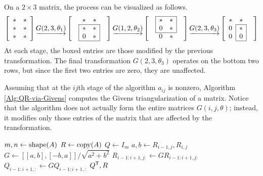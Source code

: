 On a $2 \times 3$ matrix, the process can be visualized as follows.
\[
\left[\begin{array}{cc}
* & * \\
* & * \\
* & * \\
\end{array}\right]
\underrightarrow{G(2,3,\theta_1)}
\left[\begin{array}{cccc}
&      *  &      *  & \\
\cline{2-3}
& \lvl{*} & \rvl{*} & \\
& \lvl{0} & \rvl{*} & \\
\cline{2-3}
\end{array}\right]
\underrightarrow{G(1,2,\theta_2)}
\left[\begin{array}{cccc}
\cline{2-3}
& \lvl{*} & \rvl{*} & \\
& \lvl{0} & \rvl{*} & \\
\cline{2-3}
&      0  &      *  & \\
\end{array}\right]
\underrightarrow{G(2,3,\theta_3)}
\left[\begin{array}{ccc}
     * &       *  & \\
\cline{2-2}
\rvl{0} & \rvl{*} & \\
\rvl{0} & \rvl{0} & \\
\cline{2-2}
\end{array}\right]
\]
At each stage, the boxed entries are those modified by the previous transformation.
The final transformation $G(2,3,\theta_3)$ operates on the bottom two rows, but since the first two entries are zero, they are unaffected.

Assuming that at the $ij$th stage of the algorithm $a_{ij}$ is nonzero, Algorithm \ref{Alg:QR-via-Givens} computes the Givens triangularization of a matrix.
Notice that the algorithm does not actually form the entire matrices $G(i,j,\theta)$; instead, it modifies only those entries of the matrix that are affected by the transformation.

\begin{algorithm}[H]
\begin{algorithmic}[1]
\State $m, n \gets \mathrm{shape}(A)$
\State $R \gets \mathrm{copy}(A)$
\State $Q \gets I_{m}$
      \State $a, b \gets R_{i-1,j}, R_{i,j}$
      \State $G \gets [[a, b],[-b,a]]/\sqrt{a^2+b^2}$
      \State $R_{i-1:i+1,j:} \gets GR_{i-1:i+1, j:}$
      \State $Q_{i-1:i+1,:} \gets GQ_{i-1:i+1,:}$
    \EndFor
\EndFor
\State {} $Q^{\mathsf T} , R$
\EndProcedure
\end{algorithmic}
\caption{}
\label{Alg:QR-via-Givens}
\end{algorithm}

